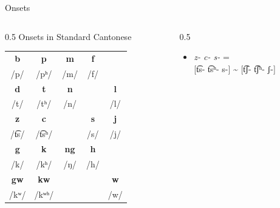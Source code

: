 \documentclass{beamer}
\begin{document}
\begin{frame}[fragile]{Onsets}

\begin{columns}
    \begin{column}{0.5\textwidth}
        Onsets in Standard Cantonese\\
        \bigskip
        \begin{tabular}{c c c c c}
            \hline
            \textbf{b} & \textbf{p} & \textbf{m} & \textbf{f} & \\ 
            /p/ & /pʰ/ & /m/ & /f/ & \\ \hline
            \textbf{d} & \textbf{t} & \textbf{n} & & \textbf{l} \\
            /t/ & /tʰ/ & /n/ & & /l/ \\ \hline
            \textbf{z} & \textbf{c} & & \textbf{s} & \textbf{j} \\
            /t͡s/ & /t͡sʰ/ & & /s/ & /j/ \\ \hline
            \textbf{g} & \textbf{k} & \textbf{ng} & \textbf{h} & \\
            /k/ & /kʰ/ & /ŋ/ & /h/ & \\ \hline
            \textbf{gw} & \textbf{kw} & & & \textbf{w} \\
            /kʷ/ & /kʷʰ/ & & & /w/ \\ \hline
        \end{tabular}
    \end{column}
    \begin{column}{0.5\textwidth} 
        \begin{itemize}
            \item \emph{z- c- s-} =\\ 
            {[}t͡s- t͡sʰ- s-{]} \~{} {[}t͡ʃ- t͡ʃʰ- ʃ-{]} 
        \end{itemize}
    \end{column}
\end{columns}

\end{frame}
\end{document}
